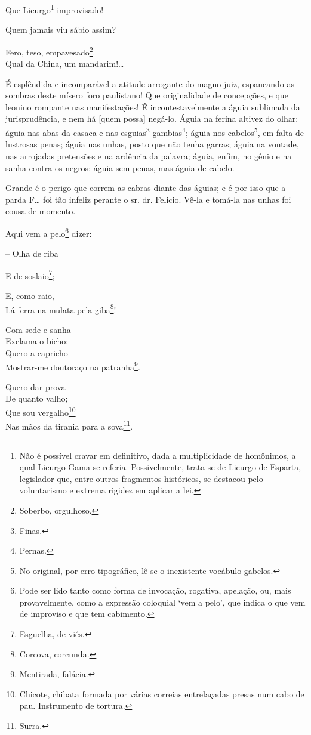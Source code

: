 Que Licurgo\footnote{ Não é possível cravar em definitivo, dada a
  multiplicidade de homônimos, a qual Licurgo Gama se referia.
  Possivelmente, trata-se de Licurgo de Esparta, legislador que, entre
  outros fragmentos históricos, se destacou pelo voluntarismo e extrema
  rigidez em aplicar a lei.} improvisado!

Quem jamais viu sábio assim?

Fero, teso, empavesado\footnote{ Soberbo, orgulhoso.}.\\
Qual da China, um mandarim!\ldots{}

É esplêndida e incomparável a atitude arrogante do magno juiz,
espancando as sombras deste mísero foro paulistano! Que originalidade de
concepções, e que leonino rompante nas manifestações! É
incontestavelmente a águia sublimada da jurisprudência, e nem há {[}quem
possa{]} negá-lo. Águia na ferina altivez do olhar; águia nas abas da
casaca e nas esguias\footnote{ Finas.} gambias\footnote{ Pernas.};
águia nos cabelos\footnote{ No original, por erro tipográfico, lê-se o
  inexistente vocábulo gabelos.}, em falta de lustrosas penas; águia nas
unhas, posto que não tenha garras; águia na vontade, nas arrojadas
pretensões e na ardência da palavra; águia, enfim, no gênio e na sanha
contra os negros: águia sem penas, mas águia de cabelo.

Grande é o perigo que correm as cabras diante das águias; e é por isso
que a parda F\ldots{} foi tão infeliz perante o sr. dr. Felicio. Vê-la e
tomá-la nas unhas foi cousa de momento.

Aqui vem a pelo\footnote{ Pode ser lido tanto como forma de invocação,
  rogativa, apelação, ou, mais provavelmente, como a expressão coloquial
  `vem a pelo', que indica o que vem de improviso e que tem cabimento.}
dizer:

-- Olha de riba

E de soslaio\footnote{ Esguelha, de viés.};

E, como raio,\\
Lá ferra na mulata pela giba\footnote{ Corcova, corcunda.}!

Com sede e sanha\\
Exclama o bicho:\\
Quero a capricho\\
Mostrar-me doutoraço na patranha\footnote{ Mentirada, falácia.}.

Quero dar prova\\
De quanto valho;\\
Que sou vergalho\footnote{ Chicote, chibata formada por várias correias
  entrelaçadas presas num cabo de pau. Instrumento de tortura.}\\
Nas mãos da tirania para a sova\footnote{ Surra.}.

